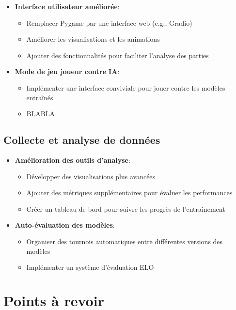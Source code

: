 \documentclass[]{article}
\begin{document}
\begin{itemize}
  \item \textbf{Interface utilisateur améliorée}:
    \begin{itemize}
      \item Remplacer Pygame par une interface web (e.g., Gradio)
      \item Améliorer les visualisations et les animations
      \item Ajouter des fonctionnalités pour faciliter l'analyse des parties
    \end{itemize}

  \item \textbf{Mode de jeu joueur contre IA}:
    \begin{itemize}
      \item Implémenter une interface conviviale pour jouer contre les modèles entraînés
      \item BLABLA
    \end{itemize}
\end{itemize}

\subsection{Collecte et analyse de données}

\begin{itemize}
  \item \textbf{Amélioration des outils d'analyse}:
    \begin{itemize}
      \item Développer des visualisations plus avancées
      \item Ajouter des métriques supplémentaires pour évaluer les performances
      \item Créer un tableau de bord pour suivre les progrès de l'entraînement
    \end{itemize}

  \item \textbf{Auto-évaluation des modèles}:
    \begin{itemize}
      \item Organiser des tournois automatiques entre différentes versions des modèles
      \item Implémenter un système d'évaluation ELO
    \end{itemize}
\end{itemize}

\section{Points à revoir}
\end{document}
